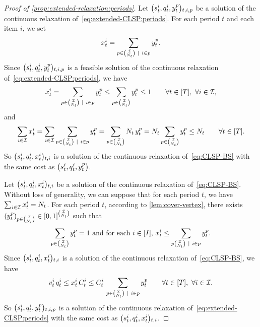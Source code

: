 \begin{proof}[Proof of \cref{prop:extended-relaxation:periods}]
Let $\bracket{\inventory_t^i, \quantity_t^i, y_t^p}_{t,i,p}$ be a solution of the continuous relaxation of~\eqref{eq:extended-CLSP:periods}.
For each period $t$ and each item $i$, we set
\begin{equation}
  x_t^i=\sum_{p\in{\mathcal{I}\choose N_t}~|~i\in p} y_t^p.
\end{equation}
Since $\bracket{\inventory_t^i, \quantity_t^i, y_t^p}_{t,i,p}$ is a feasible solution of the continuous relaxation of~\eqref{eq:extended-CLSP:periods}, we have
\begin{equation}
\setup_t^i
= \sum_{p\in{\REF\choose\nbsetups_t}~|~i\in p} y_t^p
\le \sum_{p\in{\REF\choose\nbsetups_t}} y_t^p
\le 1
\qquad \forall t\in\range{\horizon},\ \forall i\in\REF,
\end{equation}
and
\begin{equation}
\sum_{i\in\REF}\setup_t^i
= \sum_{i\in\REF}\sum_{p\in{\REF\choose\nbsetups_t}~|~i\in p} y_t^p
= \sum_{p\in{\REF\choose\nbsetups_t}} \nbsetups_t\, y_t^p
= \nbsetups_t \sum_{p\in{\REF\choose\nbsetups_t}} y_t^p
\le \nbsetups_t
\qquad \forall t\in\range{\horizon}.
\end{equation}
So $\bracket{\inventory_t^i, \quantity_t^i, \setup_t^i}_{t,i}$  is a solution of the continuous relaxation of~\eqref{eq:CLSP-BS} with the same cost as $\bracket{\inventory_t^i, \quantity_t^i, y_t^p}$.


Let $\bracket{\inventory_t^i, \quantity_t^i, \setup_t^i}_{t,i}$ be a solution of the continuous relaxation of~\eqref{eq:CLSP-BS}.
Without loss of generality, we can suppose that for each period $t$, we have $\sum_{i\in\mathcal{I}}x_t^i=N_t$.
For each period $t$, according to \cref{lem:cover-vertex}, there exists
$\bracket{y_t^p}_{p\in{\REF\choose\nbsetups_t}}\in\sqbracket{0,1}^{\REF\choose\nbsetups_t}$ such that
\begin{equation}
  \sum_{p\in{\REF\choose\nbsetups_t}}y_t^p = 1
  \ \mbox{and for each $i\in\range{I}$,}\ 
  \setup_t^i \le \sum_{p{\REF\choose\nbsetups_t}~|~i\in p} y_t^p.
\end{equation}
Since $\bracket{\inventory_t^i, \quantity_t^i, \setup_t^i}_{t,i}$ is a solution of the continuous relaxation of~\eqref{eq:CLSP-BS}, we have
\begin{equation}
\rate_t^i\, \quantity_t^i
\le \setup_t^i\, \capacity_t^i
\le \capacity_t^i\, \sum_{p\in{\REF\choose\nbsetups_t}~|~i\in p} y_t^p
\qquad \forall t\in\range{\horizon},\ \forall i\in\REF.
\end{equation}
So $\bracket{\inventory_t^i, \quantity_t^i, y_t^p}_{t,i,p}$ is a solution of the continuous relaxation of~\eqref{eq:extended-CLSP:periods} with the same cost as $\bracket{\inventory_t^i, \quantity_t^i, \setup_t^i}_{t,i}$.
\end{proof}



